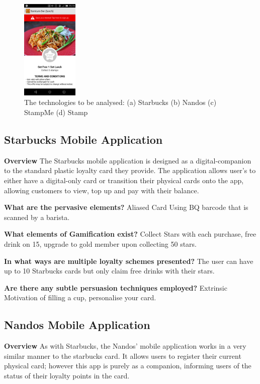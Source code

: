 \begin{figure}[H]
    \includegraphics[width=0.24\textwidth]{img/stamp.png}
      \caption{The technologies to be analysed: (a) Starbucks (b) Nandos (c) StampMe (d) Stamp}
\end{figure}

\newpage
\subsection{Starbucks Mobile Application}
\textbf{Overview}
The Starbucks mobile application is designed as a digital-companion to the standard plastic loyalty card they provide. The application allows user's to either have a digital-only card or transition their physical cards onto the app, allowing customers to view, top up and pay with their balance.

\textbf{What are the pervasive elements?}
Aliased Card Using BQ barcode that is scanned by a barista.

\textbf{What elements of Gamification exist?}
Collect Stars with each purchase, free drink on 15, upgrade to gold member upon collecting 50 stars.


\textbf{In what ways are multiple loyalty schemes presented?}
The user can have up to 10 Starbucks cards but only claim free drinks with their stars.

\textbf{Are there any subtle persuasion techniques employed?}
Extrinsic Motivation of filling a cup, personalise your card.

\subsection{Nandos Mobile Application}
\textbf{Overview}
As with Starbucks, the Nandos' mobile application works in a very similar manner to the starbucks card. It allows users to register their current physical card; however this app is purely as a companion, informing users of the status of their loyalty points in the card.


